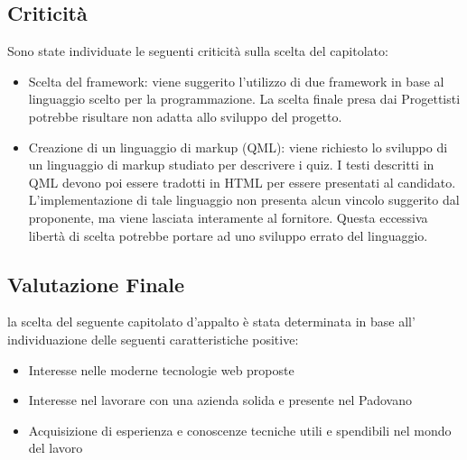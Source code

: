 \subsection{Criticità}
Sono state individuate le seguenti criticità sulla scelta del capitolato:
\begin{itemize}
\item \textsf{Scelta del framework:} viene suggerito l’utilizzo di due framework in base al linguaggio scelto per la programmazione. La scelta finale presa dai Progettisti potrebbe risultare non adatta allo sviluppo del progetto.
\item \textsf{Creazione di un linguaggio di markup (QML):} viene richiesto lo sviluppo di un linguaggio di markup studiato per descrivere i quiz. I testi descritti in QML devono poi essere tradotti in HTML per essere presentati al candidato. L’implementazione di tale linguaggio non presenta alcun vincolo suggerito dal proponente, ma viene lasciata interamente al fornitore. Questa eccessiva libertà di scelta potrebbe portare ad uno sviluppo errato del linguaggio.
\end{itemize}

\subsection{Valutazione Finale}
la scelta del seguente capitolato d’appalto è stata determinata in base all’ individuazione delle seguenti caratteristiche positive:
\begin{itemize} 
\item Interesse nelle moderne tecnologie web proposte
\item Interesse nel lavorare con una azienda solida e presente nel Padovano
\item Acquisizione di esperienza e conoscenze tecniche utili e spendibili nel mondo del lavoro
\end{itemize}